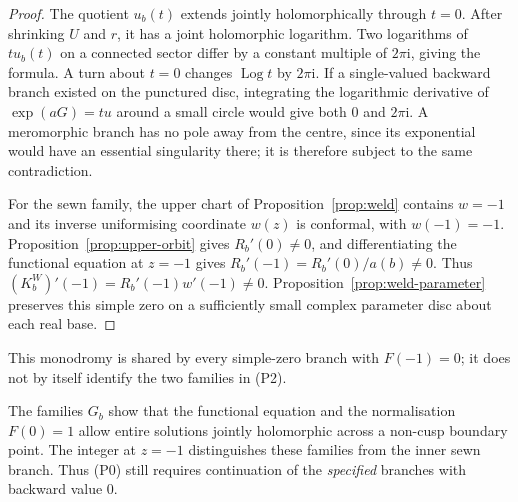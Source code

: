 \documentclass[11pt]{amsart}
\theoremstyle{definition}
\newcommand{\Rr}{R}
\newcommand{\Kk}{K}
\newcommand{\ii}{\mathrm{i}}
\begin{document}
\begin{proof}
The quotient $u_b(t)$ extends jointly holomorphically through $t=0$.
After shrinking $U$ and $r$, it has a joint holomorphic logarithm.
Two logarithms of $t u_b(t)$ on a connected sector differ by a constant
multiple of $2\pi\ii$, giving the formula.  A turn about $t=0$ changes
$\operatorname{Log}t$ by $2\pi\ii$.  If a single-valued backward branch existed on
the punctured disc, integrating the logarithmic derivative of
$\exp(aG)=t u$ around a small circle would give both $0$ and $2\pi\ii$.
A meromorphic branch has no pole away from the centre, since its
exponential would have an essential singularity there; it is therefore
subject to the same contradiction.

For the sewn family, the upper chart of Proposition~\ref{prop:weld}
contains $w=-1$ and its inverse uniformising coordinate $w(z)$ is
conformal, with $w(-1)=-1$.  Proposition~\ref{prop:upper-orbit} gives
$\Rr_b'(0)\ne0$, and differentiating the functional equation at
$z=-1$ gives
$\Rr_b'(-1)=\Rr_b'(0)/a(b)\ne0$.  Thus
$(\Kk_b^W)'(-1)=\Rr_b'(-1)w'(-1)\ne0$.
Proposition~\ref{prop:weld-parameter} preserves this simple zero on
a sufficiently small complex parameter disc about each real base.
\end{proof}

This monodromy is shared by every simple-zero branch with $F(-1)=0$;
it does not by itself identify the two families in (P2).

The families $G_b$ show that the functional equation and the normalisation
$F(0)=1$ allow entire solutions jointly holomorphic across a non-cusp
boundary point.  The integer at $z=-1$ distinguishes these families
from the inner sewn branch.  Thus (P0) still requires continuation of
the \emph{specified} branches with backward value $0$.
\end{document}
